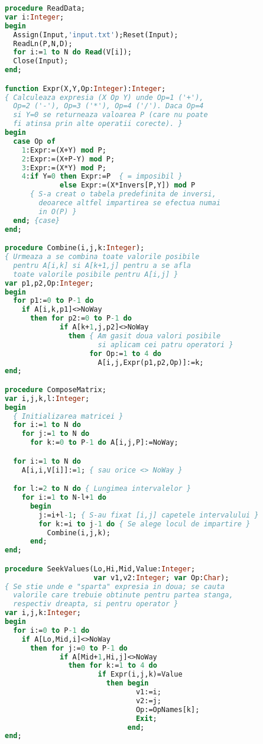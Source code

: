 \begin{lstlisting}[language=Pascal]
procedure ReadData;
var i:Integer;
begin
  Assign(Input,'input.txt');Reset(Input);
  ReadLn(P,N,D);
  for i:=1 to N do Read(V[i]);
  Close(Input);
end;

function Expr(X,Y,Op:Integer):Integer;
{ Calculeaza expresia (X Op Y) unde Op=1 ('+'),
  Op=2 ('-'), Op=3 ('*'), Op=4 ('/'). Daca Op=4
  si Y=0 se returneaza valoarea P (care nu poate
  fi atinsa prin alte operatii corecte). }
begin
  case Op of
    1:Expr:=(X+Y) mod P;
    2:Expr:=(X+P-Y) mod P;
    3:Expr:=(X*Y) mod P;
    4:if Y=0 then Expr:=P  { = imposibil }
             else Expr:=(X*Invers[P,Y]) mod P
      { S-a creat o tabela predefinita de inversi,
        deoarece altfel impartirea se efectua numai
        in O(P) }
  end; {case}
end;

procedure Combine(i,j,k:Integer);
{ Urmeaza a se combina toate valorile posibile
  pentru A[i,k] si A[k+1,j] pentru a se afla
  toate valorile posibile pentru A[i,j] }
var p1,p2,Op:Integer;
begin
  for p1:=0 to P-1 do
    if A[i,k,p1]<>NoWay
      then for p2:=0 to P-1 do
             if A[k+1,j,p2]<>NoWay
               then { Am gasit doua valori posibile
                      si aplicam cei patru operatori }
                    for Op:=1 to 4 do
                      A[i,j,Expr(p1,p2,Op)]:=k;
end;

procedure ComposeMatrix;
var i,j,k,l:Integer;
begin
  { Initializarea matricei }
  for i:=1 to N do
    for j:=1 to N do
      for k:=0 to P-1 do A[i,j,P]:=NoWay;

  for i:=1 to N do
    A[i,i,V[i]]:=1; { sau orice <> NoWay }

  for l:=2 to N do { Lungimea intervalelor }
    for i:=1 to N-l+1 do
      begin
        j:=i+l-1; { S-au fixat [i,j] capetele intervalului }
        for k:=i to j-1 do { Se alege locul de impartire }
          Combine(i,j,k);
      end;
end;

procedure SeekValues(Lo,Hi,Mid,Value:Integer;
                     var v1,v2:Integer; var Op:Char);
{ Se stie unde e "sparta" expresia in doua; se cauta
  valorile care trebuie obtinute pentru partea stanga,
  respectiv dreapta, si pentru operator }
var i,j,k:Integer;
begin
  for i:=0 to P-1 do
    if A[Lo,Mid,i]<>NoWay
      then for j:=0 to P-1 do
             if A[Mid+1,Hi,j]<>NoWay
               then for k:=1 to 4 do
                      if Expr(i,j,k)=Value
                        then begin
                               v1:=i;
                               v2:=j;
                               Op:=OpNames[k];
                               Exit;
                             end;
end;


\end{lstlisting}
